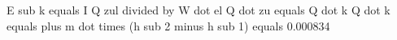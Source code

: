 E sub k equals I Q zul divided by W dot el  
Q dot zu equals Q dot k  
Q dot k equals plus m dot times (h sub 2 minus h sub 1)  
equals 0.000834
